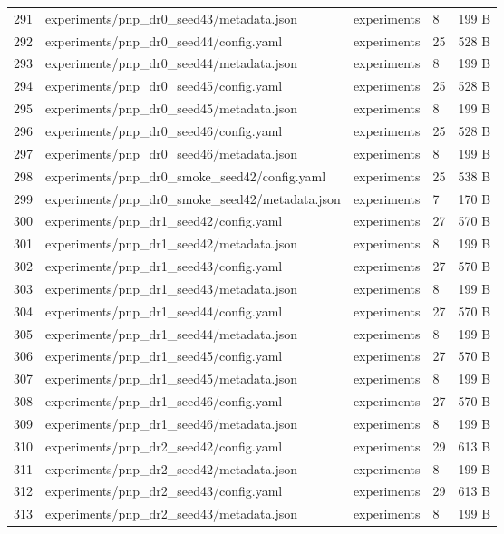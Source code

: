 \documentclass[11pt,a4paper,oneside]{book}
\begin{document}
\begin{longtable}{l l l l l}
291 & experiments/pnp\_dr0\_seed43/metadata.json & experiments & 8 & 199 B \\
292 & experiments/pnp\_dr0\_seed44/config.yaml & experiments & 25 & 528 B \\
293 & experiments/pnp\_dr0\_seed44/metadata.json & experiments & 8 & 199 B \\
294 & experiments/pnp\_dr0\_seed45/config.yaml & experiments & 25 & 528 B \\
295 & experiments/pnp\_dr0\_seed45/metadata.json & experiments & 8 & 199 B \\
296 & experiments/pnp\_dr0\_seed46/config.yaml & experiments & 25 & 528 B \\
297 & experiments/pnp\_dr0\_seed46/metadata.json & experiments & 8 & 199 B \\
298 & experiments/pnp\_dr0\_smoke\_seed42/config.yaml & experiments & 25 & 538 B \\
299 & experiments/pnp\_dr0\_smoke\_seed42/metadata.json & experiments & 7 & 170 B \\
300 & experiments/pnp\_dr1\_seed42/config.yaml & experiments & 27 & 570 B \\
301 & experiments/pnp\_dr1\_seed42/metadata.json & experiments & 8 & 199 B \\
302 & experiments/pnp\_dr1\_seed43/config.yaml & experiments & 27 & 570 B \\
303 & experiments/pnp\_dr1\_seed43/metadata.json & experiments & 8 & 199 B \\
304 & experiments/pnp\_dr1\_seed44/config.yaml & experiments & 27 & 570 B \\
305 & experiments/pnp\_dr1\_seed44/metadata.json & experiments & 8 & 199 B \\
306 & experiments/pnp\_dr1\_seed45/config.yaml & experiments & 27 & 570 B \\
307 & experiments/pnp\_dr1\_seed45/metadata.json & experiments & 8 & 199 B \\
308 & experiments/pnp\_dr1\_seed46/config.yaml & experiments & 27 & 570 B \\
309 & experiments/pnp\_dr1\_seed46/metadata.json & experiments & 8 & 199 B \\
310 & experiments/pnp\_dr2\_seed42/config.yaml & experiments & 29 & 613 B \\
311 & experiments/pnp\_dr2\_seed42/metadata.json & experiments & 8 & 199 B \\
312 & experiments/pnp\_dr2\_seed43/config.yaml & experiments & 29 & 613 B \\
313 & experiments/pnp\_dr2\_seed43/metadata.json & experiments & 8 & 199 B \\

\end{longtable}
\end{document}
